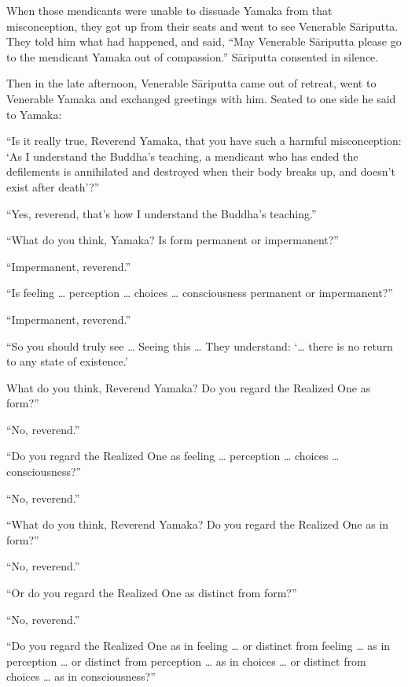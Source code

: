 \documentclass[12pt,openany]{book}%
\begin{document}
When those mendicants were unable to dissuade Yamaka from that misconception, they got up from their seats and went to see Venerable \textsanskrit{Sāriputta}. They told him what had happened, and said, “May Venerable \textsanskrit{Sāriputta} please go to the mendicant Yamaka out of compassion.” \textsanskrit{Sāriputta} consented in silence. 

Then in the late afternoon, Venerable \textsanskrit{Sāriputta} came out of retreat, went to Venerable Yamaka and exchanged greetings with him. Seated to one side he said to Yamaka: 

“Is it really true, Reverend Yamaka, that you have such a harmful misconception: ‘As I understand the Buddha’s teaching, a mendicant who has ended the defilements is annihilated and destroyed when their body breaks up, and doesn’t exist after death’?” 

“Yes, reverend, that’s how I understand the Buddha’s teaching.” 

“What do you think, Yamaka? Is form permanent or impermanent?” 

“Impermanent, reverend.” 

“Is feeling … perception … choices … consciousness permanent or impermanent?” 

“Impermanent, reverend.” 

“So you should truly see … Seeing this … They understand: ‘… there is no return to any state of existence.’ 

What do you think, Reverend Yamaka? Do you regard the Realized One as form?” 

“No, reverend.” 

“Do you regard the Realized One as feeling … perception … choices … consciousness?” 

“No, reverend.” 

“What do you think, Reverend Yamaka? Do you regard the Realized One as in form?” 

“No, reverend.” 

“Or do you regard the Realized One as distinct from form?” 

“No, reverend.” 

“Do you regard the Realized One as in feeling … or distinct from feeling … as in perception … or distinct from perception … as in choices … or distinct from choices … as in consciousness?” 
\end{document}
